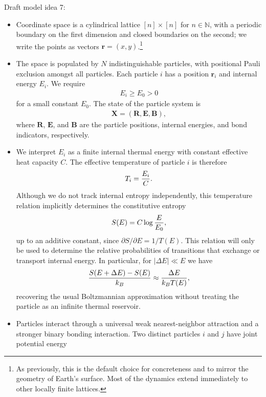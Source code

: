 \documentclass[12pt,letterpaper]{article}
\newcommand{\mb}{\mathbf}
\begin{document}
Draft model idea 7:
\begin{itemize}
\item Coordinate space is a cylindrical lattice $[n] \times [n]$ for $n \in \mathbb{N}$, with a periodic boundary on the first dimension and closed boundaries on the second; we write the points as vectors $\mb{r} = (x,y)$.\footnote{As previously, this is the default choice for concreteness and to mirror the geometry of Earth's surface. Most of the dynamics extend immediately to other locally finite lattices.}
\item The space is populated by $N$ indistinguishable particles, with positional Pauli exclusion amongst all particles. Each particle $i$ has a position $\mb{r}_{i}$ and internal energy $E_{i}$. We require
\begin{align*}
E_{i} \geq E_{0} > 0
\end{align*}
for a small constant $E_{0}$. The state of the particle system is
\begin{align*}
\mb{X} = (\mb{R}, \mb{E}, \mb{B}),
\end{align*}
where $\mb{R}$, $\mb{E}$, and $\mb{B}$ are the particle positions, internal energies, and bond indicators, respectively. %
\item We interpret $E_{i}$ as a finite internal thermal energy with constant effective heat capacity $C$. The effective temperature of particle $i$ is therefore
\begin{align*}
T_{i} = {E_{i} \over C}.
\end{align*}
Although we do not track internal entropy independently, this temperature relation implicitly determines the constitutive entropy
\begin{align*}
S(E) = C\log{E \over E_{0}},
\end{align*}
up to an additive constant, since $\partial S/\partial E = 1/T(E)$. This relation will only be used to determine the relative probabilities of transitions that exchange or transport internal energy. In particular, for $|\Delta E| \ll E$ we have
\begin{align*}
{S(E + \Delta E) - S(E) \over k_{B}} \approx {\Delta E \over k_{B}T(E)},
\end{align*}
recovering the usual Boltzmannian approximation without treating the particle as an infinite thermal reservoir.
\item Particles interact through a universal weak nearest-neighbor attraction and a stronger binary bonding interaction. Two distinct particles $i$ and $j$ have joint potential energy

\end{itemize}
\end{document}
